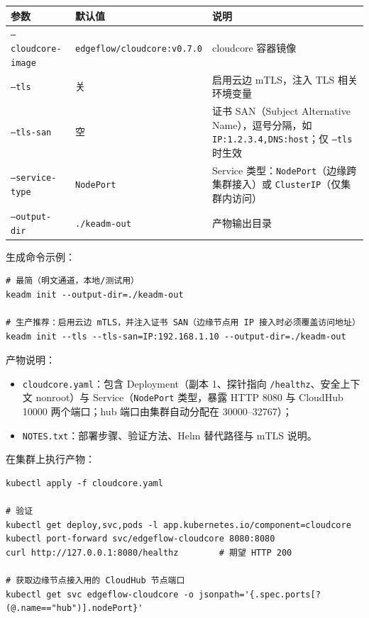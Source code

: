 \begin{tabularx}{\textwidth}{|l|l|X|}
  \hline
  \textbf{参数} & \textbf{默认值} & \textbf{说明} \\
  \hline
  \texttt{--cloudcore-image} & \texttt{edgeflow/cloudcore:v0.7.0} & cloudcore 容器镜像 \\
  \hline
  \texttt{--tls} & 关 & 启用云边 mTLS，注入 TLS 相关环境变量 \\
  \hline
  \texttt{--tls-san} & 空 & 证书 SAN（Subject Alternative Name），逗号分隔，如 \texttt{IP:1.2.3.4,DNS:host}；仅 \texttt{--tls} 时生效 \\
  \hline
  \texttt{--service-type} & \texttt{NodePort} & Service 类型：\texttt{NodePort}（边缘跨集群接入）或 \texttt{ClusterIP}（仅集群内访问） \\
  \hline
  \texttt{--output-dir} & \texttt{./keadm-out} & 产物输出目录 \\
  \hline
\end{tabularx}

生成命令示例：

\begin{lstlisting}
# 最简（明文通道，本地/测试用）
keadm init --output-dir=./keadm-out

# 生产推荐：启用云边 mTLS，并注入证书 SAN（边缘节点用 IP 接入时必须覆盖访问地址）
keadm init --tls --tls-san=IP:192.168.1.10 --output-dir=./keadm-out
\end{lstlisting}

产物说明：

\begin{itemize}
  \item \texttt{cloudcore.yaml}：包含 Deployment（副本 1、探针指向 \texttt{/healthz}、安全上下文 nonroot）与 Service（\texttt{NodePort} 类型，暴露 HTTP 8080 与 CloudHub 10000 两个端口；hub 端口由集群自动分配在 30000--32767）；
  \item \texttt{NOTES.txt}：部署步骤、验证方法、Helm 替代路径与 mTLS 说明。
\end{itemize}

在集群上执行产物：

\begin{lstlisting}
kubectl apply -f cloudcore.yaml

# 验证
kubectl get deploy,svc,pods -l app.kubernetes.io/component=cloudcore
kubectl port-forward svc/edgeflow-cloudcore 8080:8080
curl http://127.0.0.1:8080/healthz        # 期望 HTTP 200

# 获取边缘节点接入用的 CloudHub 节点端口
kubectl get svc edgeflow-cloudcore -o jsonpath='{.spec.ports[?(@.name=="hub")].nodePort}'
\end{lstlisting}

